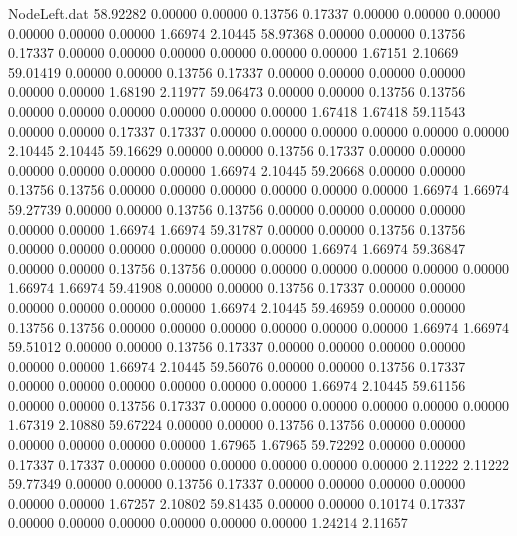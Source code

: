 \begin{filecontents}{NodeLeft.dat}
  58.92282    0.00000    0.00000     0.13756    0.17337    0.00000    0.00000    0.00000    0.00000    0.00000    0.00000    1.66974    2.10445
  58.97368    0.00000    0.00000     0.13756    0.17337    0.00000    0.00000    0.00000    0.00000    0.00000    0.00000    1.67151    2.10669
  59.01419    0.00000    0.00000     0.13756    0.17337    0.00000    0.00000    0.00000    0.00000    0.00000    0.00000    1.68190    2.11977
  59.06473    0.00000    0.00000     0.13756    0.13756    0.00000    0.00000    0.00000    0.00000    0.00000    0.00000    1.67418    1.67418
  59.11543    0.00000    0.00000     0.17337    0.17337    0.00000    0.00000    0.00000    0.00000    0.00000    0.00000    2.10445    2.10445
  59.16629    0.00000    0.00000     0.13756    0.17337    0.00000    0.00000    0.00000    0.00000    0.00000    0.00000    1.66974    2.10445
  59.20668    0.00000    0.00000     0.13756    0.13756    0.00000    0.00000    0.00000    0.00000    0.00000    0.00000    1.66974    1.66974
  59.27739    0.00000    0.00000     0.13756    0.13756    0.00000    0.00000    0.00000    0.00000    0.00000    0.00000    1.66974    1.66974
  59.31787    0.00000    0.00000     0.13756    0.13756    0.00000    0.00000    0.00000    0.00000    0.00000    0.00000    1.66974    1.66974
  59.36847    0.00000    0.00000     0.13756    0.13756    0.00000    0.00000    0.00000    0.00000    0.00000    0.00000    1.66974    1.66974
  59.41908    0.00000    0.00000     0.13756    0.17337    0.00000    0.00000    0.00000    0.00000    0.00000    0.00000    1.66974    2.10445
  59.46959    0.00000    0.00000     0.13756    0.13756    0.00000    0.00000    0.00000    0.00000    0.00000    0.00000    1.66974    1.66974
  59.51012    0.00000    0.00000     0.13756    0.17337    0.00000    0.00000    0.00000    0.00000    0.00000    0.00000    1.66974    2.10445
  59.56076    0.00000    0.00000     0.13756    0.17337    0.00000    0.00000    0.00000    0.00000    0.00000    0.00000    1.66974    2.10445
  59.61156    0.00000    0.00000     0.13756    0.17337    0.00000    0.00000    0.00000    0.00000    0.00000    0.00000    1.67319    2.10880
  59.67224    0.00000    0.00000     0.13756    0.13756    0.00000    0.00000    0.00000    0.00000    0.00000    0.00000    1.67965    1.67965
  59.72292    0.00000    0.00000     0.17337    0.17337    0.00000    0.00000    0.00000    0.00000    0.00000    0.00000    2.11222    2.11222
  59.77349    0.00000    0.00000     0.13756    0.17337    0.00000    0.00000    0.00000    0.00000    0.00000    0.00000    1.67257    2.10802
  59.81435    0.00000    0.00000     0.10174    0.17337    0.00000    0.00000    0.00000    0.00000    0.00000    0.00000    1.24214    2.11657

\end{filecontents}
